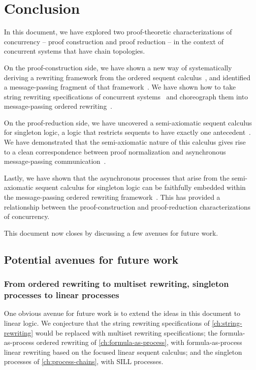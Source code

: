 \chapter{Conclusion}\label{ch:conclusion}

In this document, we have explored two proof-theoretic characterizations of concurrency -- proof construction and proof reduction -- in the context of concurrent systems that have chain topologies.

On the proof-construction side, we have shown a new way of systematically deriving a rewriting framework from the ordered sequent calculus~, and identified a message-passing fragment of that framework~.
We have shown how to take string rewriting specifications of concurrent systems~ and choreograph them into message-passing ordered rewriting~.

On the proof-reduction side, we have uncovered a semi-axiomatic sequent calculus for singleton logic, a logic that restricts sequents to have exactly one antecedent~.
We have demonstrated that the semi-axiomatic nature of this calculus gives rise to a clean correspondence between proof normalization and asynchronous message-passing communication~.

Lastly, we have shown that the asynchronous processes that arise from the semi-axiomatic sequent calculus for singleton logic can be faithfully embedded within the message-passing ordered rewriting framework~.
This has provided a relationship between the proof-construction and proof-reduction characterizations of concurrency.

This document now closes by discussing a few avenues for future work.

\section{Potential avenues for future work}\label{sec:conclusion:nondeterminism}

\subsection{From ordered rewriting to multiset rewriting, singleton processes to linear processes}\label{sec:conclusion:generalize}

One obvious avenue for future work is to extend the ideas in this document to linear logic.
We conjecture that the string rewriting specifications of \cref{ch:string-rewriting} would be replaced with multiset rewriting specifications\autocite{Meseguer:TCS92}; the formula-as-process ordered rewriting of \cref{ch:formula-as-process}, with formula-as-process linear rewriting based on the focused linear sequent calculus\autocites{Miller:ELP92}{Cervesato+Scedrov:IC09}; and the singleton processes of \cref{ch:process-chains}, with \acs{SILL} processes\autocite{Caires+:MSCS16}.

